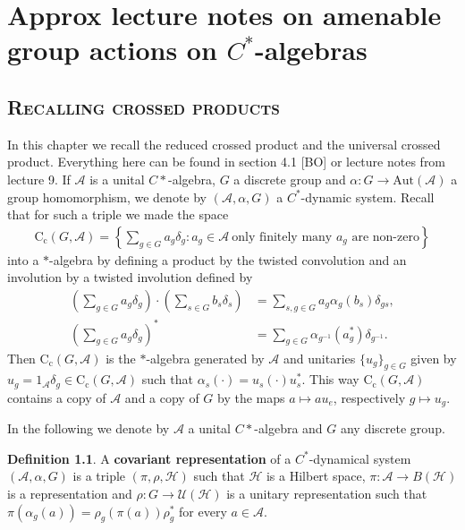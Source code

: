 \documentclass[10pt,oneside,openany,final]{memoir}
\newcommand{\sssection}[1]{%
\section[#1]{\centering\normalfont\scshape \textbf{#1}}}
\theoremstyle{definition}
\newtheorem{definition}[theorem]{Definition}
\theoremstyle{Break}
\newcommand{\A}{\mathcal{A}}
\newcommand{\cc}{\text{C}_{\text{c}}}
\renewcommand{\H}{\mathcal{H}}
\begin{document}
\newpage

\chapter{Approx lecture notes on amenable group actions on $C^*$-algebras} 
\sssection{Recalling crossed products}
In this chapter we recall the reduced crossed product and the universal
crossed product. Everything here can be found in section 4.1 [BO] or lecture
notes from lecture 9. If $\A$ is a unital $C*$-algebra, $G$ a discrete group and
$\alpha \colon G \to \text{Aut}(\A)$ a group homomorphism, we denote by $(\A,\alpha,G)$ a $C^*$-dynamic system. Recall that for such a triple we made the space 
\begin{align*}
\cc(G,\A)=\left\{\sum_{g \in G}a_{g}\delta_{g} \colon a_{g} \in \A\ \text{only
finitely many $a_{g}$ are non-zero}\right\}
\end{align*}
into a $*$-algebra by defining a product by the twisted convolution and an involution by a twisted involution defined by
\begin{align*}
\left(\sum_{g \in G}a_{g}\delta_{g} \right) \cdot \left( \sum_{s \in G}b_{s}\delta_{s}\right) &= \sum_{s,g \in G} a_{g} \alpha_{g}(b_{s})\delta_{gs}, \\ \left(\sum_{g \in G}a_{g}\delta_{g}\right)^*&=\sum_{g \in G}\alpha_{g^{-1}}(a_{g}^*)\delta_{g^{-1}}.
\end{align*}
Then $\cc(G,\A)$ is the $*$-algebra generated by $\A$ and unitaries $\{u_{g} \}_{g \in G}$  given by $u_{g}=1_{\A} \delta_{g} \in \cc(G,\A)$ such that $\alpha_{s}(\cdot)=u_{s}(\cdot)u_{s}^*$. This way $\cc(G,\A)$ contains a copy of $\A$ and a copy of $G$ by the maps $a \mapsto a u_{e}$, respectively $g \mapsto u_{g}$. 

In the following we denote by $\A$ a unital $C*$-algebra and $G$ any discrete group.
\begin{definition}
A \textbf{covariant representation} of a $C^*$-dynamical system
$(\A,\alpha,G)$ is a triple $(\pi,\rho,\H)$ such that $\H$ is a Hilbert space,
$\pi \colon \A \to B(\H)$ is a representation and $\rho \colon G \to
\mathcal{U}(\H)$ is a unitary representation such that $\pi(
\alpha_{g}(a))=\rho_{g}(\pi(a))\rho_{g}^*$ for every $a \in \A$. 
\end{definition}
\end{document}
